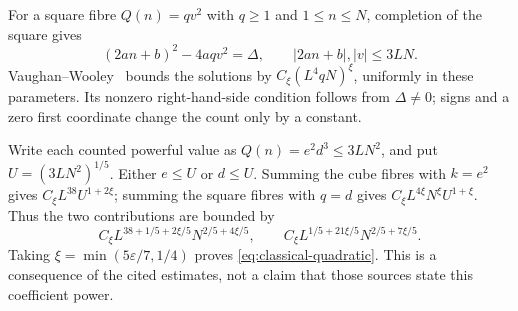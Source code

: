 \documentclass[11pt,reqno]{amsart}
\theoremstyle{definition}
\theoremstyle{remark}
\numberwithin{equation}{section}
\newcommand{\eps}{\varepsilon}\newcommand{\card}{\#}
\begin{document}
For a square fibre $Q(n)=qv^2$ with $q\ge1$ and $1\le n\le N$,
completion of the square gives
\[
 (2an+b)^2-4aqv^2=\Delta,
 \qquad |2an+b|,|v|\le3LN.
\]
Vaughan--Wooley~\cite[Lemma~3.5]{vw} bounds the solutions by
$C_\xi(L^4qN)^\xi$, uniformly in these parameters. Its nonzero
right-hand-side condition follows from $\Delta\ne0$; signs and a
zero first coordinate change the count only by a constant.

Write each counted powerful value as $Q(n)=e^2d^3\le3LN^2$,
and put $U=(3LN^2)^{1/5}$. Either $e\le U$ or $d\le U$.
Summing the cube fibres with $k=e^2$ gives
$C_\xi L^{38}U^{1+2\xi}$; summing the square fibres with $q=d$
gives $C_\xi L^{4\xi}N^\xi U^{1+\xi}$.
Thus the two contributions are bounded by
\[
 C_\xi L^{38+1/5+2\xi/5}N^{2/5+4\xi/5},\qquad
 C_\xi L^{1/5+21\xi/5}N^{2/5+7\xi/5}.
\]
Taking $\xi=\min(5\eps/7,1/4)$ proves
\eqref{eq:classical-quadratic}. This is a consequence of the cited
estimates, not a claim that those sources state this coefficient power.
\end{document}
